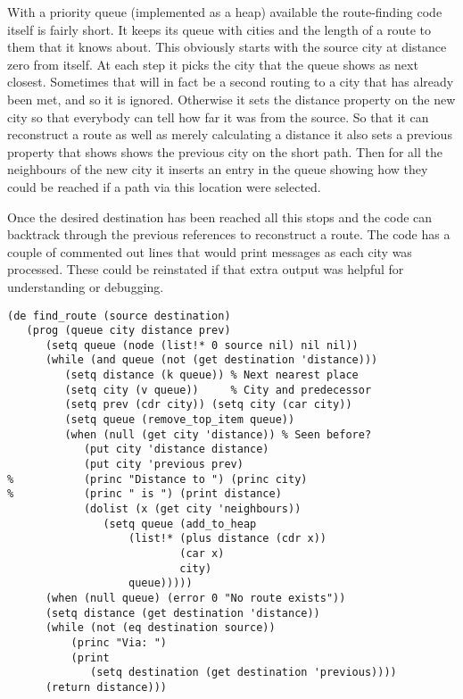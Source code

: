 With a priority queue (implemented as a heap) available the route-finding
code itself is fairly short. It keeps its queue with cities and the
length of a route to them that it knows about. This obviously starts with
the source city at distance zero from itself. At each step it
picks the city that the queue shows as next closest. Sometimes that will in
fact be a second routing to a city that has already been met, and so it
is ignored. Otherwise it sets the {\tx distance} property on the new city
so that everybody can tell how far it was from the source. So that it can
reconstruct a route as well as merely calculating a distance it also
sets a {\tx previous} property that shows shows the previous city on the
short path. Then for all the neighbours of the new city it inserts an
entry in the queue showing how they could be reached if a path via this
location were selected.

Once the desired destination has been reached all this stops and the code
can backtrack through the {\tx previous} references to reconstruct a
route. The code has a couple of commented out lines that would print messages
as each city was processed. These could be reinstated if that extra output was
helpful for understanding or debugging.
{\small\begin{verbatim}
(de find_route (source destination)
   (prog (queue city distance prev)
      (setq queue (node (list!* 0 source nil) nil nil))
      (while (and queue (not (get destination 'distance)))
         (setq distance (k queue)) % Next nearest place
         (setq city (v queue))     % City and predecessor
         (setq prev (cdr city)) (setq city (car city))
         (setq queue (remove_top_item queue))
         (when (null (get city 'distance)) % Seen before?
            (put city 'distance distance)
            (put city 'previous prev)
%           (princ "Distance to ") (princ city)
%           (princ " is ") (print distance)
            (dolist (x (get city 'neighbours))
               (setq queue (add_to_heap
                   (list!* (plus distance (cdr x))
                           (car x)
                           city)
                   queue)))))
      (when (null queue) (error 0 "No route exists"))
      (setq distance (get destination 'distance))
      (while (not (eq destination source))
          (princ "Via: ")
          (print
             (setq destination (get destination 'previous))))
      (return distance)))
\end{verbatim}}

